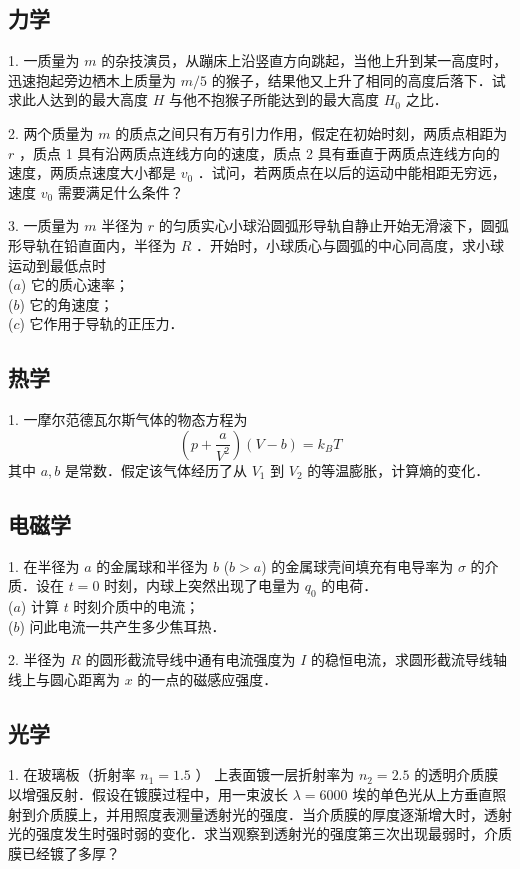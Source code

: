 
\subsection{力学}
1. 一质量为 $m$ 的杂技演员，从蹦床上沿竖直方向跳起，当他上升到某一高度时，迅速抱起旁边栖木上质量为 $m/5$ 的猴子，结果他又上升了相同的高度后落下．试求此人达到的最大高度 $H$ 与他不抱猴子所能达到的最大高度 $H_{0}$ 之比．

2. 两个质量为 $m$ 的质点之间只有万有引力作用，假定在初始时刻，两质点相距为 $r$ ，质点 1 具有沿两质点连线方向的速度，质点 2 具有垂直于两质点连线方向的速度，两质点速度大小都是 $v_{0}$ ．试问，若两质点在以后的运动中能相距无穷远，速度 $v_0$ 需要满足什么条件？

3. 一质量为 $m$ 半径为 $r$ 的匀质实心小球沿圆弧形导轨自静止开始无滑滚下，圆弧形导轨在铅直面内，半径为 $R$ ．开始时，小球质心与圆弧的中心同高度，求小球运动到最低点时\\ 
($a$) 它的质心速率；\\
($b$) 它的角速度；\\
($c$) 它作用于导轨的正压力．
\subsection{热学}
1. 一摩尔范德瓦尔斯气体的物态方程为 
\begin{equation}
\left(p+\frac{a}{V^{2}}\right)(V-b)=k_{B} T
\end{equation}
其中 $a, b$ 是常数．假定该气体经历了从 $V_{1}$ 到 $V_{2}$ 的等温膨胀，计算熵的变化．
\subsection{电磁学}
1. 在半径为 $a$ 的金属球和半径为 $b$ ($b>a$) 的金属球壳间填充有电导率为 $\sigma$ 的介质．设在 $t=0$ 时刻，内球上突然出现了电量为 $q_0$ 的电荷．\\
($a$) 计算 $t$ 时刻介质中的电流；\\
($b$) 问此电流一共产生多少焦耳热．

2. 半径为 $R$ 的圆形截流导线中通有电流强度为 $I$ 的稳恒电流，求圆形截流导线轴线上与圆心距离为 $x$ 的一点的磁感应强度．
\subsection{光学}
1. 在玻璃板（折射率 $n_{1}=1.5$ ） 上表面镀一层折射率为 $n_{2}=2.5$ 的透明介质膜以增强反射．假设在镀膜过程中，用一束波长 $\lambda=6000 $ 埃的单色光从上方垂直照射到介质膜上，并用照度表测量透射光的强度．当介质膜的厚度逐渐增大时，透射光的强度发生时强时弱的变化．求当观察到透射光的强度第三次出现最弱时，介质膜已经镀了多厚？